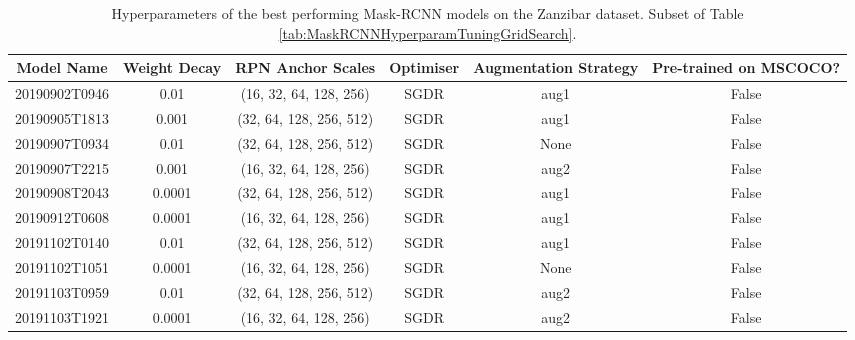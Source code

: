 \begin{table}[!ht]
	\tiny
	\begin{adjustbox}{width=\columnwidth, center}
		\begin{tabular}{cccccc}
			\toprule
			Model Name & Weight Decay &        RPN Anchor Scales & Optimiser & Augmentation Strategy & Pre-trained on MSCOCO? \\
			\midrule
				20190902T0946 &         0.01 &   (16, 32, 64, 128, 256) &      SGDR &                  aug1 &                  False \\
				20190905T1813 &        0.001 &  (32, 64, 128, 256, 512) &      SGDR &                  aug1 &                  False \\
				20190907T0934 &         0.01 &  (32, 64, 128, 256, 512) &      SGDR &                  None &                  False \\
				20190907T2215 &        0.001 &   (16, 32, 64, 128, 256) &      SGDR &                  aug2 &                  False \\
				20190908T2043 &       0.0001 &  (32, 64, 128, 256, 512) &      SGDR &                  aug1 &                  False \\
				20190912T0608 &       0.0001 &   (16, 32, 64, 128, 256) &      SGDR &                  aug1 &                  False \\
				20191102T0140 &         0.01 &  (32, 64, 128, 256, 512) &      SGDR &                  aug1 &                  False \\
				20191102T1051 &       0.0001 &   (16, 32, 64, 128, 256) &      SGDR &                  None &                  False \\
				20191103T0959 &         0.01 &  (32, 64, 128, 256, 512) &      SGDR &                  aug2 &                  False \\
				20191103T1921 &       0.0001 &   (16, 32, 64, 128, 256) &      SGDR &                  aug2 &                  False \\
			\bottomrule
		\end{tabular}
	\end{adjustbox}
	\caption{Hyperparameters of the best performing Mask-RCNN models on the Zanzibar dataset. Subset of Table \ref{tab:MaskRCNNHyperparamTuningGridSearch}.}
	\label{tab:best-mask-rcnn-models}
\end{table}





